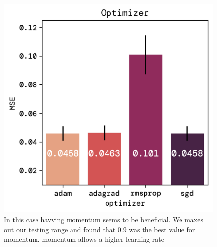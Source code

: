 \documentclass[twoside,11pt]{report}
\begin{document}
    \begin{figure}[!ht]
        \begin{minipage}[t]{0.5\textwidth - 1mm}
            \begin{center}
                \includegraphics[width=\textwidth]{../runsAndFigures/MSE_optimizer.png}
            \end{center}
            \caption{In this case havving momentum seems to be beneficial. 
            We maxes out our testing range and found that 0.9 was the best value for momentum. 
            momentum allows a higher learning rate}\label{fig:MSE_optimizer}
        \end{minipage}
        \hspace{2mm}
        \begin{minipage}[t]{0.5\textwidth - 1mm}
            \begin{center}

\end{center}
\end{minipage}
\end{figure}
\end{document}
